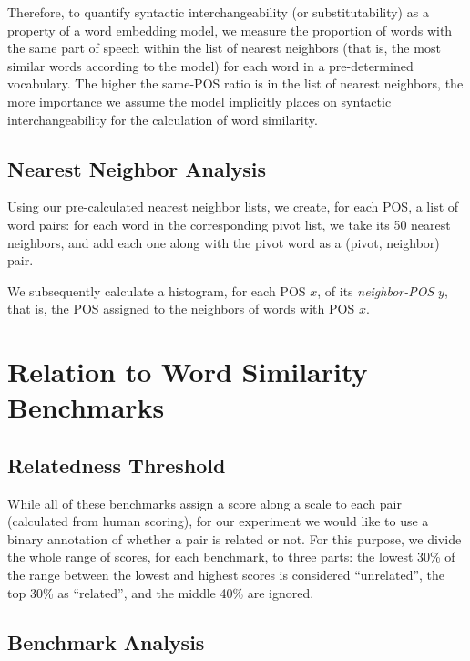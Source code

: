 \documentclass[11pt,a4paper]{article}
\begin{document}
    Therefore, to quantify syntactic interchangeability (or substitutability)
    as a property of a word embedding model,
    we measure the proportion of words with the same part of speech
    within the list of nearest neighbors
    (that is, the most similar words according to the model)
    for each word in a pre-determined vocabulary.
    The higher the same-POS ratio is in the list of nearest neighbors,
    the more importance we assume the model implicitly places on syntactic interchangeability
    for the calculation of word similarity.
    
    \subsection{Nearest Neighbor Analysis}\label{sec:nn_analysis}
    
    Using our pre-calculated nearest neighbor lists, we create, for each
    POS, a list of word pairs: for each word in the corresponding pivot list,
    we take its 50 nearest neighbors, and add each one along with the pivot word
    as a (pivot, neighbor) pair.
    
    We subsequently calculate a histogram, for each POS $x$, of its
    \textit{neighbor-POS} $y$, that is, the POS assigned to the neighbors of
    words with POS $x$.
    
    
    \section{Relation to Word Similarity Benchmarks}\label{sec:benchmarks}


    \subsection{Relatedness Threshold}\label{sec:threshold}
    
    While all of these benchmarks assign a score along a scale to each pair
    (calculated from human scoring), for our experiment we would like to use
    a binary annotation of whether a pair is related or not.
    For this purpose, we divide the whole range of scores,
    for each benchmark, to three parts:
    the lowest 30\% of the range between the lowest and highest scores
    is considered ``unrelated'', the top 30\% as ``related'',
    and the middle 40\% are ignored.
    
    \subsection{Benchmark Analysis}\label{benchmark_analysis}
    
\end{document}

